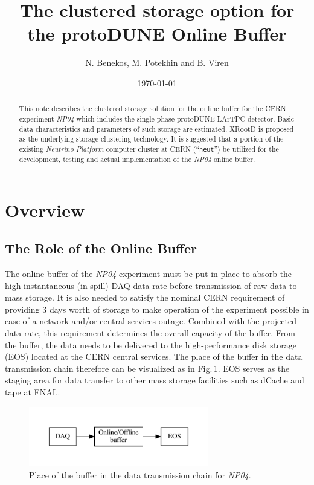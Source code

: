 \documentclass[pdftex,12pt,letter]{article}
\title{The clustered storage option for the protoDUNE \expname Online Buffer}
\date{\today}
\author{N. Benekos, M. Potekhin and B. Viren}
\newcommand{\xrd}{XRootD\xspace}
\newcommand{\expname}{\textit{NP04}\xspace}
\begin{document}
\maketitle

\begin{abstract}
\noindent  This note describes the clustered storage
solution for the online buffer for the CERN experiment \expname which includes the single-phase protoDUNE LArTPC detector.
Basic data characteristics and  parameters of such storage are estimated. \xrd is proposed as the underlying
storage clustering technology. It is suggested that a portion of the existing   \textit{Neutrino Platform}
computer cluster at CERN (``\texttt{neut}'') be utilized for the development, testing and actual implementation of the \expname online buffer. 
\end{abstract}

\section{Overview}
\subsection{The Role of the Online Buffer}
\label{sec:the_role}
The online buffer of the \expname experiment must be put in place to absorb the high instantaneous (in-spill) DAQ
data rate before transmission of raw data to mass storage. It is also needed to satisfy the nominal CERN requirement of
providing 3 days worth of storage to make operation of the experiment possible in case of a network and/or central services
outage. Combined with the projected data rate, this requirement determines the overall capacity of the buffer. From the buffer,
the data needs to be delivered to the high-performance  disk storage (EOS) located at the CERN central services.
The place of the buffer in the data transmission chain therefore can be visualized as in Fig.\,\ref{fig:big-picture}.
EOS serves as the staging area for data transfer to other mass storage facilities such as dCache and tape at FNAL.
\begin{figure}[tbh]
  \centering
  \includegraphics[width=0.7\textwidth]{figures/big-picture.pdf}
  \caption{Place of the buffer in the data transmission chain for \expname.}
  \label{fig:big-picture}
\end{figure}
\end{document}
